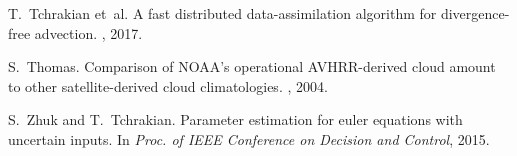 \documentclass[onecolumn, 12pt, conference]{ieeeconf}
\begin{document}
\begin{thebibliography}{10}
T.~Tchrakian et~al.
\newblock A fast distributed data-assimilation algorithm for divergence-free
  advection.
, 2017.

S.~Thomas.
\newblock Comparison of {NOAA}'s operational {AVHRR}-derived cloud amount to
  other satellite-derived cloud climatologies.
, 2004.

S.~Zhuk and T.~Tchrakian.
\newblock Parameter estimation for euler equations with uncertain inputs.
\newblock In {\em Proc. of IEEE Conference on Decision and Control}, 2015.

\end{thebibliography}

%
\end{document}
